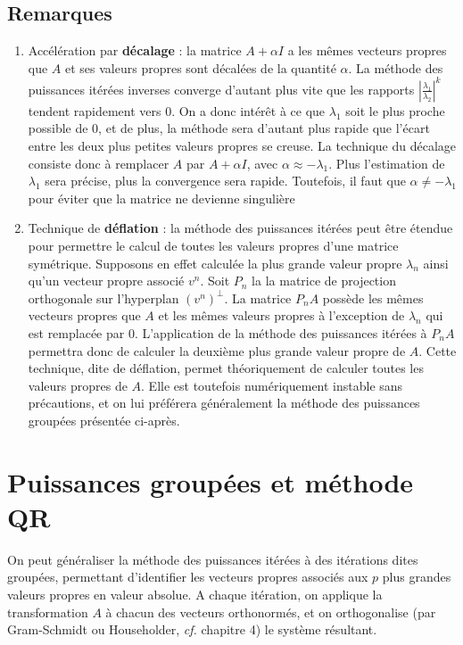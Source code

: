 \subsection{Remarques}
\begin{enumerate}
	\item Accélération par \textbf{décalage} : la matrice $A+\alpha I$ a les mêmes vecteurs propres que $A$ et ses valeurs propres sont décalées de la quantité $\alpha$. La méthode des puissances itérées inverses converge d'autant plus vite que les rapports $\left|\frac{\lambda_1}{\lambda_2}\right|^k$ tendent rapidement vers 0. On a donc intérêt à ce que $\lambda_1$ soit le plus proche possible de 0, et de plus, la méthode sera d'autant plus rapide que l'écart entre les deux plus petites valeurs propres se creuse. La technique du décalage consiste donc à remplacer $A$ par $A+\alpha I$, avec $\alpha\approx -\lambda_1$. Plus l'estimation de $\lambda_1$ sera précise, plus la convergence sera rapide. Toutefois, il faut que $\alpha\neq -\lambda_1$ pour éviter que la matrice ne devienne singulière
	\item Technique de \textbf{déflation} : la méthode des puissances itérées peut être étendue pour permettre le calcul de toutes les valeurs propres d'une matrice symétrique. Supposons en effet calculée la plus grande valeur propre $\lambda_n$ ainsi qu'un vecteur propre associé $v^n$. Soit $P_n$ la la matrice de projection orthogonale sur l'hyperplan $(v^n)^\bot$. La matrice $P_nA$ possède les mêmes vecteurs propres que $A$ et les mêmes valeurs propres à l'exception de $\lambda_n$ qui est remplacée par 0. L'application de la méthode des puissances itérées à $P_nA$ permettra donc de calculer la deuxième plus grande valeur propre de $A$. Cette technique, dite de déflation, permet théoriquement de calculer toutes les valeurs propres de $A$. Elle est toutefois numériquement instable sans précautions, et on lui préférera généralement la méthode des puissances groupées présentée ci-après.
\end{enumerate}

\section{Puissances groupées et méthode QR}  %

On peut généraliser la méthode des puissances itérées à des itérations dites groupées, permettant d'identifier les vecteurs propres associés aux $p$ plus grandes valeurs propres
en valeur absolue. A chaque itération, on applique la transformation $A$ à chacun des vecteurs orthonormés, et on orthogonalise (par Gram-Schmidt ou Householder, {\it cf.} chapitre 4) le système résultant.

